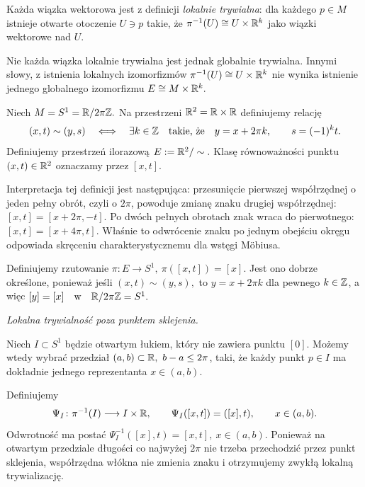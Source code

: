 \begin{uwaga}
Każda wiązka wektorowa jest z definicji \emph{lokalnie trywialna}:
dla każdego $p\in M$ istnieje otwarte otoczenie $U\ni p$ takie, że
$
\pi^{-1}(U)\cong U\times\mathbb{R}^k
$
jako wiązki wektorowe nad $U$.

Nie każda wiązka lokalnie trywialna jest jednak globalnie trywialna.
Innymi słowy, z istnienia lokalnych izomorfizmów
$
\pi^{-1}(U)\cong U\times\mathbb{R}^k
$
nie wynika istnienie jednego globalnego izomorfizmu
$
E\cong M\times\mathbb{R}^k.
$
\end{uwaga}
\begin{przyklad}
\label{prz:mobius}

Niech
$
M=S^1=\mathbb{R}/2\pi\mathbb{Z}.
$
Na przestrzeni $\mathbb{R}^2=\mathbb{R}\times\mathbb{R}$ definiujemy relację
\[
(x,t)\sim(y,s)
\quad\Longleftrightarrow\quad
\exists k\in\mathbb{Z}
\quad\text{takie, że}\quad
y=x+2\pi k,\qquad s=(-1)^k t.
\]
Definiujemy przestrzeń ilorazową
$
E:=\mathbb{R}^2/\sim.
$
Klasę równoważności punktu $(x,t)\in\mathbb{R}^2$ oznaczamy przez
$
[x,t].
$

Interpretacja tej definicji jest następująca:
przesunięcie pierwszej współrzędnej o jeden pełny obrót, czyli o $2\pi$,
powoduje zmianę znaku drugiej współrzędnej:
$
[x,t]=[x+2\pi,-t].
$
Po dwóch pełnych obrotach znak wraca do pierwotnego:
$
[x,t]=[x+4\pi,t].
$
Właśnie to odwrócenie znaku po jednym obejściu okręgu odpowiada
skręceniu charakterystycznemu dla wstęgi Möbiusa.

Definiujemy rzutowanie $\pi\colon E\longrightarrow S^1, \ \pi([x,t])=[x]$.
Jest ono dobrze określone, ponieważ jeśli
$
(x,t)\sim(y,s),
$
to
$
y=x+2\pi k
$
dla pewnego $k\in\mathbb{Z}$, a więc
$
[y]=[x]
\quad\text{w}\quad
\mathbb{R}/2\pi\mathbb{Z}=S^1.
$

\medskip
\emph{Lokalna trywialność poza punktem sklejenia.}

Niech $I\subset S^1$ będzie otwartym łukiem, który nie zawiera punktu $[0]$.
Możemy wtedy wybrać przedział $(a,b)\subset\mathbb{R}, \ b-a\leq2\pi$,
taki, że każdy punkt $p\in I$ ma dokładnie jednego reprezentanta
$x\in(a,b)$.

Definiujemy
\[
\Psi_I\colon \pi^{-1}(I)\longrightarrow I\times\mathbb{R},
\qquad
\Psi_I([x,t])=([x],t),
\qquad x\in(a,b).
\]
Odwrotność ma postać $\Psi_I^{-1}([x],t)=[x,t], \ x\in(a,b)$.
Ponieważ na otwartym przedziale długości co najwyżej $2\pi$
nie trzeba przechodzić
przez punkt sklejenia, współrzędna włókna nie zmienia znaku i otrzymujemy
zwykłą lokalną trywializację.


\end{przyklad}
